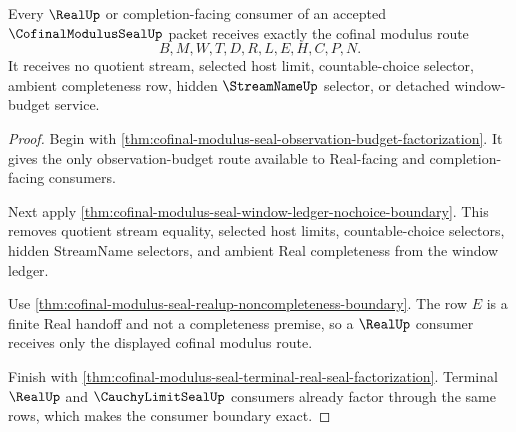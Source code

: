 \begin{theorem}
\label{thm:cofinal-modulus-seal-real-completion-consumer-exactness}
Every $\RealUp$ or completion-facing consumer of an accepted $\CofinalModulusSealUp$ packet receives exactly the cofinal modulus route
$$
B,M,W,T,D,R,L,E,H,C,P,N.
$$
It receives no quotient stream, selected host limit, countable-choice selector, ambient completeness row, hidden $\StreamNameUp$ selector, or detached window-budget service.
\end{theorem}
\begin{proof}
Begin with \autoref{thm:cofinal-modulus-seal-observation-budget-factorization}. It gives the only observation-budget route available to Real-facing and completion-facing consumers.

Next apply \autoref{thm:cofinal-modulus-seal-window-ledger-nochoice-boundary}. This removes quotient stream equality, selected host limits, countable-choice selectors, hidden StreamName selectors, and ambient Real completeness from the window ledger.

Use \autoref{thm:cofinal-modulus-seal-realup-noncompleteness-boundary}. The row $E$ is a finite Real handoff and not a completeness premise, so a $\RealUp$ consumer receives only the displayed cofinal modulus route.

Finish with \autoref{thm:cofinal-modulus-seal-terminal-real-seal-factorization}. Terminal $\RealUp$ and $\CauchyLimitSealUp$ consumers already factor through the same rows, which makes the consumer boundary exact.
\end{proof}

